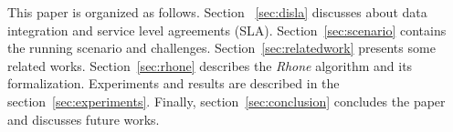 
This paper is organized as follows. Section ~\ref{sec:disla} discusses
about data integration and service level agreements (SLA).
Section~\ref{sec:scenario} contains the running scenario and challenges.
Section~\ref{sec:relatedwork} presents some related works.
Section~\ref{sec:rhone} describes the \textit{Rhone} algorithm and its
formalization.
Experiments and results are described in the section~\ref{sec:experiments}. 
Finally, section~\ref{sec:conclusion} concludes the paper and discusses future works.
